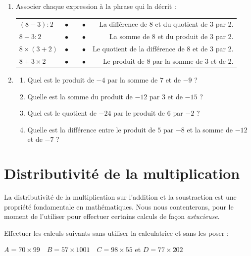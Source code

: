 \documentclass[a4paper]{book}
\begin{document}
    \begin{exemple}
        \begin{enumerate}
            \item Associer chaque expression à la phrase qui la décrit :

            \begin{center}
            \begin{tabular}{l c p{1cm} c r}
                 \((8 - 3) : 2\) & $\bullet$ & & $\bullet$ & La différence de 8 et du quotient de 3 par 2. \\
                \(8 - 3 : 2\) & $\bullet$ & & $\bullet$ & La somme de 8 et du produit de 3 par 2. \\
                \(8 \times (3 + 2)\) & $\bullet$ & & $\bullet$ & Le quotient de la différence de 8 et de 3 par 2. \\
                \(8 + 3 \times 2\) & $\bullet$ & & $\bullet$ & Le produit de 8 par la somme de 3 et de 2. \\
            \end{tabular}
            \end{center}

            \item \begin{enumerate}
                \item Quel est le produit de \(-4\) par la somme de \(7\) et de \(-9\) ?
            
                \item Quelle est la somme du produit de \(-12\) par \(3\) et de \(-15\) ?
            
                \item Quel est le quotient de \(-24\) par le produit de \(6\) par \(-2\) ?
            
                \item Quelle est la différence entre le produit de \(5\) par \(-8\) et la somme de \(-12\) et de \(-7\) ?
            \end{enumerate}
        \end{enumerate}
    \end{exemple}


\section{Distributivité de la multiplication}

    \begin{remarque}
        La distributivité de la multiplication sur l'addition et la soustraction est une propriété fondamentale en mathématiques. Nous nous contenterons, pour le moment de l'utiliser pour effectuer certains calculs de façon \textit{astucieuse}.
    \end{remarque}


    \begin{exemple}
        Effectuer les calculs suivants sans utiliser la calculatrice et sans les poser :

        $A=70\times 99  \quad B=57\times 1001 \quad C=98 \times 55$ et $D=77\times202$
    \end{exemple}
\end{document}
